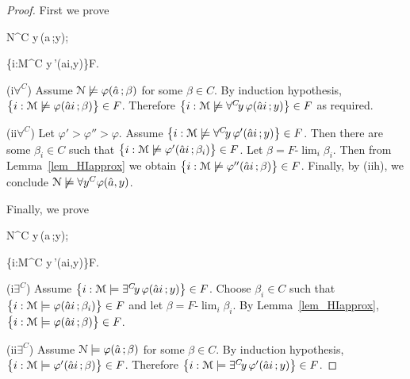 \documentclass[11pt,oneside]{amsart}
\theoremstyle{plain}
\theoremstyle{remark}
\begin{document}
\begin{proof}
  First we prove
  
  {\Rightarrow}
  {{\EuScript N}\models\forall^C\! y\,\varphi(\hat a\,;y)};

  {\Rightarrow}
  {\big\{i:{\EuScript M}\models\forall^C\! y\,\varphi'(\hat ai,y)\big\}\in F}.
  
  (\textsf{i}$\forall^C$) Assume ${\EuScript N}\not\models\varphi(\hat a\,;  \beta)$ for some $\beta\in C$.
  By induction hypothesis, $\big\{ i: {\EuScript M}\not\models\varphi(\hat ai\,;\beta)\big\}\in F$.
  Therefore $\big\{ i:{\EuScript M}\not\models\forall^C\!y\,\varphi(\hat ai\,;y)\big\}\in F$ as required.

  (\textsf{ii}$\forall^C$) Let $\varphi'>\varphi''>\varphi$. Assume $\big\{ i:{\EuScript M}\not\models\forall^C\!y\,\varphi'(\hat ai\,;y)\big\}\in F$.
  Then there are some $\beta_i\in C$ such that $\big\{ i:{\EuScript M}\not\models\varphi'(\hat ai\,;\beta_i)\big\}\in F$.
  Let $\beta=F\mbox{-}\lim_i\beta_i$.
  Then from Lemma~\ref{lem_HIapprox} we obtain $\big\{ i:{\EuScript M}\not\models\varphi''(\hat ai\,;\beta)\big\}\in F$.
  Finally, by  (\textsf{iih}), we conclude ${\EuScript N}\not\models\forall y^C\!\,\varphi(\hat a,y)$.
  
  Finally, we prove
  
  {\Rightarrow}
  {{\EuScript N}\models\exists^C\! y\,\varphi(\hat a\,;y)};

  {\Rightarrow}
  {\big\{i:{\EuScript M}\models\exists^C\! y\,\varphi'(\hat ai,y)\big\}\in F}.
  
  (\textsf{i}$\exists^C$) Assume $\big\{ i:{\EuScript M}\models\exists^C\!y\,\varphi(\hat ai\,;y)\big\}\in F$.
  Choose $\beta_i\in C$ such that $\big\{ i:{\EuScript M}\models\varphi(\hat ai\,;\beta_i)\big\}\in F$ and let $\beta=F\mbox{-}\lim_i\beta_i$.
  By Lemma~\ref{lem_HIapprox}, $\big\{ i:{\EuScript M}\models\varphi(\hat ai\,;\beta)\big\}\in F$.
  
  (\textsf{ii}$\exists^C$) Assume ${\EuScript N}\models\varphi(\hat a\,;  \beta)$ for some $\beta\in C$.
  By induction hypothesis, $\big\{ i: {\EuScript M}\models\varphi'(\hat ai\,;\beta)\big\}\in F$.
  Therefore $\big\{ i:{\EuScript M}\models\exists^C\!y\,\varphi'(\hat ai\,;y)\big\}\in F$.
\end{proof}
\end{document}
